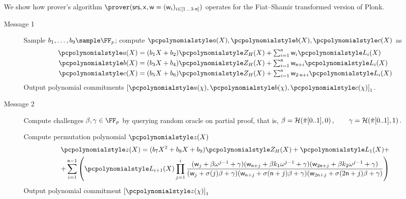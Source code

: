 We show how prover's algorithm
$\prover(\srs, \inp, \wit = (\wit_i)_{i \in \range{1}{3 \cdot \noofc}})$ operates for
the Fiat--Shamir transformed version of Plonk.
\begin{description}
\item[Message 1] Sample $b_1, \ldots, b_9 \sample \FF_p$; compute
  $\p{a}(X), \p{b}(X), \p{c}(X)$ as
	\begin{align*}
		\p{a}(X) &= (b_1 X + b_2)\p{Z_H}(X) + \textstyle \sum_{i = 1}^{\noofc} \wit_i \lag_i(X) \\
		\p{b}(X) &= (b_3 X + b_4)\p{Z_H}(X) + \textstyle \sum_{i = 1}^{\noofc} \wit_{\noofc + i} \lag_i(X) \\
		\p{c}(X) &= (b_5 X + b_6)\p{Z_H}(X) + \textstyle \sum_{i = 1}^{\noofc} \wit_{2 \cdot \noofc + i} \lag_i(X) 
	\end{align*}
	Output polynomial commitments $\gone{\p{a}(\chi), \p{b}(\chi), \p{c}(\chi)}$.  
	
\item[Message 2] Compute challenges $\beta, \gamma \in \FF_p$ by querying random oracle
  on partial proof, that is,
	\(
		\beta = \mathcal{H}(\tilde{\pi}[0..1], 0)\,, \qquad \gamma = \mathcal{H}(\tilde{\pi}[0..1], 1)\,.
	\)
  
	Compute permutation polynomial $\p{z}(X)$
	\begin{multline*}
		\p{z}(X) = (b_7 X^2 + b_8 X + b_9)\p{Z_H}(X) + \lag_1(X) + \\
    + \sum_{i = 1}^{\noofc - 1} \left(\lag_{i + 1} (X) \prod_{j = 1}^{i} \frac{
        (\wit_j +\beta \omega^{j - 1} + \gamma)(\wit_{\noofc + j} + \beta k_1
        \omega^{j - 1} + \gamma)(\wit_{2 \noofc + j} +\beta k_2 \omega^{j- 1} +
        \gamma)} {(\wit_j+\sigma(j) \beta + \gamma)(\wit_{\noofc + j} + \sigma(\noofc
        + j)\beta + \gamma)(\wit_{2 \noofc + j} + \sigma(2 \noofc + j)\beta +
        \gamma)}\right)
	\end{multline*}
	Output polynomial commitment $\gone{\p{z}(\chi)}$
		

\end{description}
